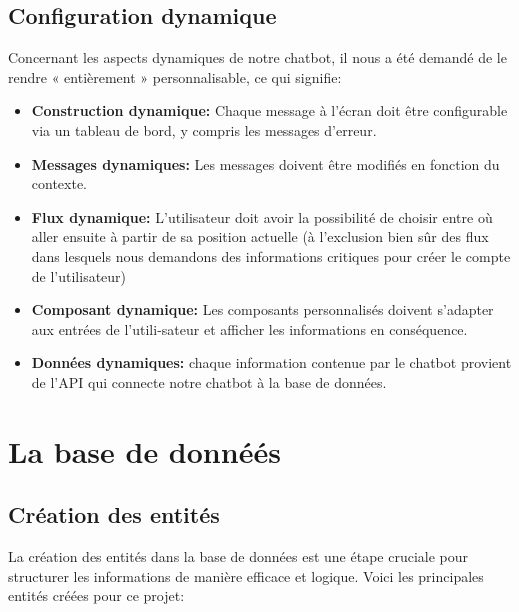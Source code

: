\subsection{Configuration dynamique}

\hspace{16pt}Concernant les aspects dynamiques de notre chatbot, il nous a été demandé de le rendre « entièrement » personnalisable, ce qui signifie:

\begin{itemize}
  \item \textbf{Construction dynamique: }Chaque message à l'écran doit être configurable via un tableau de bord, y compris les messages d'erreur.
  \item \textbf{Messages dynamiques: }Les messages doivent être modifiés en fonction du contexte.
  \item \textbf{Flux dynamique: }L'utilisateur doit avoir la possibilité de choisir entre où aller ensuite à partir de sa position actuelle (à l'exclusion bien sûr des flux dans lesquels nous demandons des informations critiques pour créer le compte de l'utilisateur)
  \item \textbf{Composant dynamique: }Les composants personnalisés doivent s'adapter aux entrées de l'utili-sateur et afficher les informations en conséquence.
  \item \textbf{Données dynamiques: }chaque information contenue par le chatbot provient de l'API qui connecte notre chatbot à la base de données.
\end{itemize}

\section{La base de donnéés}


\subsection{Création des entités}

\hspace{16pt}La création des entités dans la base de données est une étape cruciale pour structurer les informations de manière efficace et logique. Voici les principales entités créées pour ce projet:

